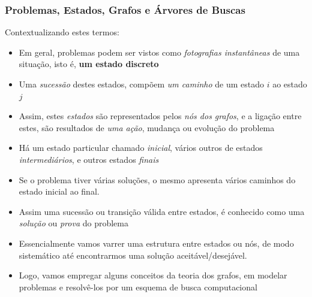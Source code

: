 \begin{frame}[fragile,  allowframebreaks=0.8]
\frametitle{Problemas, Estados, Grafos e  Árvores de Buscas}

Contextualizando estes termos:

\begin{itemize}

  \item Em geral, problemas podem ser vistos como \textit{fotografias 
  instantâneas} de uma situação, isto é, \textbf{um estado discreto}
   
  \item Uma \textit{sucessão} destes estados, compõem \textit{um caminho} de um estado $i$ ao estado $j$
  
  \item Assim, estes \textit{estados} são representados pelos \textit{nós dos grafos}, e a ligação entre 
  estes, são resultados de \textit{uma ação}, mudança ou evolução do problema
  
  \item Há um estado particular chamado \textit{inicial},  vários outros de estados \textit{intermediários},
   e outros estados \textit{finais}
  
  \item Se o problema tiver várias soluções,  o mesmo apresenta vários caminhos do estado inicial ao  final.
  
  \item Assim uma sucessão ou transição válida entre estados, é conhecido como uma \textit{solução} ou \textit{prova}
     do problema

  \item Essencialmente vamos varrer uma estrutura
     entre estados ou nós, de modo sistemático até encontrarmos
     uma solução aceitável/desejável.

    \item Logo, vamos empregar alguns conceitos da teoria dos grafos, em modelar problemas e resolvê-los 
  por um esquema de busca computacional
  
    
\end{itemize}

\end{frame}




